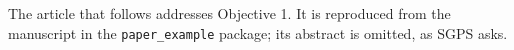 The article that follows addresses Objective 1. It is reproduced from the
manuscript in the \texttt{paper\_example} package; its abstract is omitted, as
SGPS asks.
